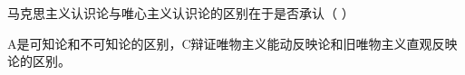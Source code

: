 \question 马克思主义认识论与唯心主义认识论的区别在于是否承认（ ）
\par{}
\begin{solution}A是可知论和不可知论的区别，C辩证唯物主义能动反映论和旧唯物主义直观反映论的区别。
\end{solution}
